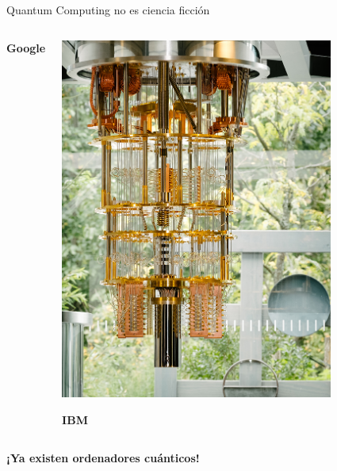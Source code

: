 \documentclass[11pt,compress]{beamer}
\begin{document}
\begin{frame}{Quantum Computing no es ciencia ficción}
\begin{columns}
\begin{center}
    {\large\color{ChetwodeBlue}\textbf{Google}}
    \end{center}
    \begin{center}
    \includegraphics[width=0.78\textwidth]{./images/ibm-50q.jpg}

    {\large\color{ChetwodeBlue}\textbf{IBM}}
    \end{center}
  \end{columns}
  \begin{tcolorbox}[colback=ChetwodeBlue!10,colframe=ChetwodeBlue!60]
    \begin{center}
      {\large\color{TurkishRose}\textbf{¡Ya existen ordenadores cuánticos!}}
    \end{center}
  \end{tcolorbox}
\end{frame}
\end{document}
